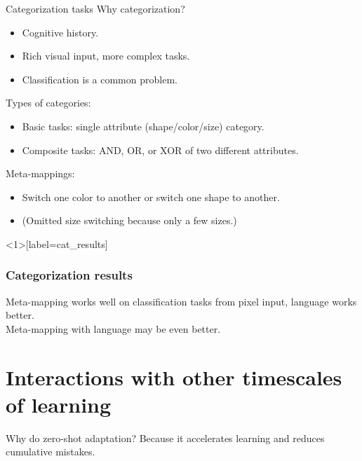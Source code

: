 \documentclass{beamer}
\begin{document}
\begin{frame}{Categorization tasks}
Why categorization? 
\begin{itemize}
\item Cognitive history.
\item Rich visual input, more complex tasks.
\item Classification is a common problem.
\end{itemize}
Types of categories:
\begin{itemize}
\item Basic tasks: single attribute (shape/color/size) category.
\item Composite tasks: AND, OR, or XOR of two different attributes.  
\end{itemize}
Meta-mappings:
\begin{itemize}
\item Switch one color to another or switch one shape to another. 
\item (Omitted size switching because only a few sizes.)
\end{itemize}
\end{frame}


\begin{frame}<1>[label=cat_results]
\frametitle{Categorization results}
\end{frame}


\begin{frame}[standout]
Meta-mapping works well on classification tasks from pixel input, language works better.\\[1em]
Meta-mapping with language may be even better.
\end{frame}

\section{Interactions with other timescales of learning}

\begin{frame}{Why do zero-shot adaptation?}
Because it accelerates learning and reduces cumulative mistakes.
{
\centering
{}
}
\end{frame}
\end{document}
